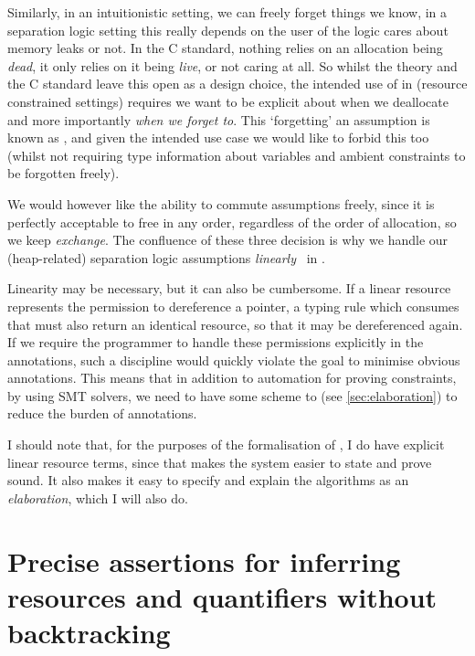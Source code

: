 Similarly, in an intuitionistic setting, we can freely forget things we know,
in a separation logic setting this really depends on the user of the logic
cares about memory leaks or not. In the C standard, nothing relies on an
allocation being \emph{dead}, it only relies on it being \emph{live}, or not
caring at all. So whilst the theory and the C standard leave this open as a
design choice, the intended use of  in (resource constrained settings)
requires we want to be explicit about when we deallocate and more importantly
\emph{when we forget to}. This `forgetting'
an assumption is known as , and given the intended use case we
would like to forbid this too (whilst not requiring type information about
variables and ambient constraints to be forgotten freely).

We would however like the ability to commute assumptions freely, since it is
perfectly acceptable to free in any order, regardless of the order of
allocation, so we keep \emph{exchange}. The confluence of these three decision
is why we handle our (heap-related) separation logic assumptions
\emph{linearly}~ in .

Linearity may be necessary, but it can also be cumbersome. If a linear resource
represents the permission to dereference a pointer, a typing rule which
consumes that must also return an identical resource, so that it may be
dereferenced again. If we require the programmer to handle these permissions
explicitly in the annotations, such a discipline would quickly violate the goal
to minimise obvious annotations. This means that in addition to automation for
proving constraints, by using SMT solvers, we need to have some scheme to
 (see \cref{sec:elaboration}) to
reduce the burden of annotations.

I should note that, for the purposes of the formalisation of , I
do have explicit linear resource terms, since that makes the system easier to
state and prove sound. It also makes it easy to specify and explain the 
 algorithms as an \emph{elaboration}, which I will also
do.

\section{Precise assertions for inferring resources and quantifiers without backtracking}

